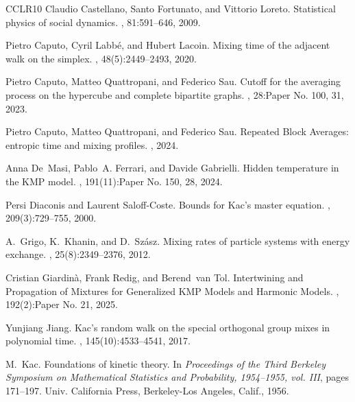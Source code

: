 \documentclass[11pt,reqno]{amsart}
\theoremstyle{remark}
\theoremstyle{definition}
\numberwithin{equation}{section}
\numberwithin{figure}{section}
\begin{document}
\begin{thebibliography}{CCLR{\etalchar{+}}10}
	Claudio Castellano, Santo Fortunato, and Vittorio Loreto.
	\newblock Statistical physics of social dynamics.
	, 81:591--646, 2009.
	
	Pietro Caputo, Cyril Labb\'{e}, and Hubert Lacoin.
	\newblock Mixing time of the adjacent walk on the simplex.
	, 48(5):2449--2493, 2020.
	
	Pietro Caputo, Matteo Quattropani, and Federico Sau.
	\newblock Cutoff for the averaging process on the hypercube and complete
	bipartite graphs.
	, 28:Paper No. 100, 31, 2023.
	
	Pietro Caputo, Matteo Quattropani, and Federico Sau.
	\newblock Repeated {B}lock {A}verages: entropic time and mixing profiles.
	, 2024.
	
	Anna De~Masi, Pablo~A. Ferrari, and Davide Gabrielli.
	\newblock Hidden temperature in the {KMP} model.
	, 191(11):Paper No. 150, 28, 2024.
	
	Persi Diaconis and Laurent Saloff-Coste.
	\newblock Bounds for {K}ac's master equation.
	, 209(3):729--755, 2000.
	
	A.~Grigo, K.~Khanin, and D.~Sz\'{a}sz.
	\newblock Mixing rates of particle systems with energy exchange.
	, 25(8):2349--2376, 2012.
	
	Cristian Giardin\`a, Frank Redig, and Berend~van Tol.
	\newblock Intertwining and {P}ropagation of {M}ixtures for {G}eneralized {KMP}
	{M}odels and {H}armonic {M}odels.
	, 192(2):Paper No. 21, 2025.
	
	Yunjiang Jiang.
	\newblock Kac's random walk on the special orthogonal group mixes in polynomial
	time.
	, 145(10):4533--4541, 2017.
	
	M.~Kac.
	\newblock Foundations of kinetic theory.
	\newblock In {\em Proceedings of the {T}hird {B}erkeley {S}ymposium on
		{M}athematical {S}tatistics and {P}robability, 1954--1955, vol. {III}}, pages
	171--197. Univ. California Press, Berkeley-Los Angeles, Calif., 1956.
	

\end{thebibliography}
\end{document}
